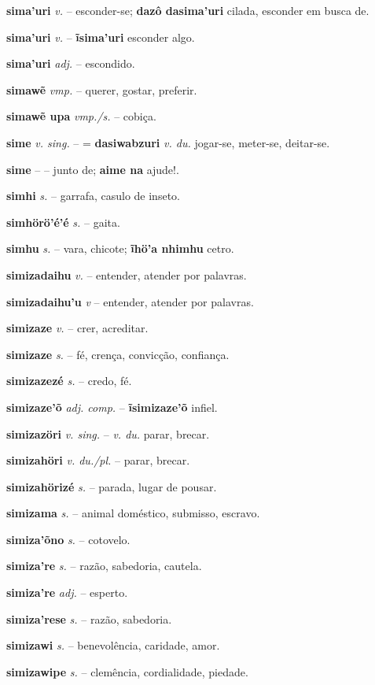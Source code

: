 \textbf{sima'uri} \textit{v.} -- esconder-se; \textbf{dazô dasima'uri} cilada, esconder em busca de.

\textbf{sima'uri} \textit{v.} -- \textbf{ĩsima'uri} esconder algo.

\textbf{sima'uri} \textit{adj.} -- escondido.

\textbf{simawẽ} \textit{vmp.} -- querer, gostar, preferir.

\textbf{simawẽ upa} \textit{vmp./s.} -- cobiça.

\textbf{sime} \textit{v. sing.} -- = \textbf{dasiwabzuri} \textit{v. du.} jogar-se, meter-se, deitar-se.

\textbf{sime} \textit{} -- -- junto de; \textbf{aime na} ajude!.

\textbf{simhi} \textit{s.} -- garrafa, casulo de inseto.

\textbf{simhörö'é'é} \textit{s.} -- gaita.

\textbf{simhu} \textit{s.} -- vara, chicote; \textbf{ĩhö'a nhimhu} cetro.

\textbf{simizadaihu} \textit{v.} -- entender, atender por palavras.

\textbf{simizadaihu'u} \textit{v} -- entender, atender por palavras.

\textbf{simizaze} \textit{v.} -- crer, acreditar.

\textbf{simizaze} \textit{s.} -- fé, crença, convicção, confiança.

\textbf{simizazezé} \textit{s.} -- credo, fé.

\textbf{simizaze'õ} \textit{adj. comp.} -- \textbf{ĩsimizaze'õ} infiel.

\textbf{simizazöri} \textit{v. sing.} -- \textit{v. du.} parar, brecar.

\textbf{simizahöri} \textit{v. du./pl.} -- parar, brecar.

\textbf{simizahörizé} \textit{s.} -- parada, lugar de pousar.

\textbf{simizama} \textit{s.} -- animal doméstico, submisso, escravo.

\textbf{simiza'õno} \textit{s.} -- cotovelo.

\textbf{simiza're} \textit{s.} -- razão, sabedoria, cautela.

\textbf{simiza're} \textit{adj.} -- esperto.

\textbf{simiza'rese} \textit{s.} -- razão, sabedoria.

\textbf{simizawi} \textit{s.} -- benevolência, caridade, amor.

\textbf{simizawipe} \textit{s.} -- clemência, cordialidade, piedade.

